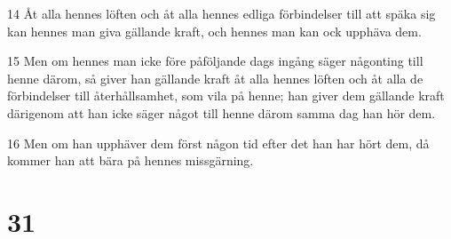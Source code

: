 \par 14 Åt alla hennes löften och åt alla hennes edliga förbindelser till att späka sig kan hennes man giva gällande kraft, och hennes man kan ock upphäva dem.
\par 15 Men om hennes man icke före påföljande dags ingång säger någonting till henne därom, så giver han gällande kraft åt alla hennes löften och åt alla de förbindelser till återhållsamhet, som vila på henne; han giver dem gällande kraft därigenom att han icke säger något till henne därom samma dag han hör dem.
\par 16 Men om han upphäver dem först någon tid efter det han har hört dem, då kommer han att bära på hennes missgärning.

\chapter{31}

